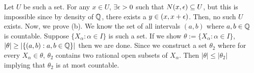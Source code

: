 \begin{ExerciseList}
    \Answer Let $U$ be such a set. For any $x\in U$, $\exists \epsilon>0$ %
    such that $N(x,\epsilon)\subseteq U$, but this is impossible since %
    by density of $\mathbb{Q}$, there exists a $y\in(x,x+\epsilon)$. Then, no %
    such $U$ exists. Now, we prove (b). We know the set of all %
    intervals $(a,b)$ where $a,b\in\mathbb{Q}$ is countable. Suppose %
    $\{X_{\alpha}:\alpha\in I\}$ is such a set. If we show %
    $\theta:=\{X_{\alpha}:\alpha\in I\}$, $|\theta|\geq|%
    \{(a,b):a,b\in\QQ\}|$ then we are done. Since we construct %
    a set $\theta_2$ where for every $X_{\alpha}\in\theta$, %
    $\theta_2$ contains two rational open subsets of $X_{\alpha}$.
    Then $|\theta|\leq|\theta_2|$ implying that $\theta_2$ is at %
    most countable.
\end{ExerciseList}
